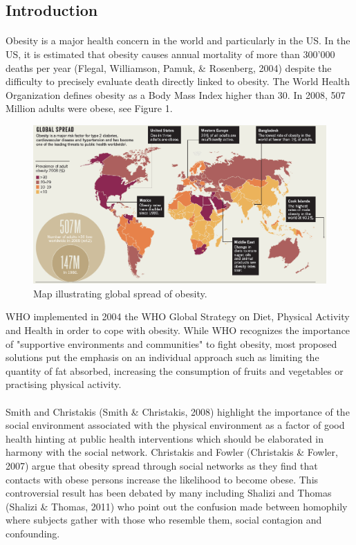 \documentclass[11pt]{article}
\begin{document}
\subsection{Introduction}
\paragraph{}
Obesity is a major health concern in the world and particularly in the US. In the US, it is estimated that obesity causes annual mortality of more than 300'000 deaths per year (Flegal, Williamson, Pamuk, \& Rosenberg, 2004) despite the difficulty to precisely evaluate death directly linked to obesity. The World Health Organization defines obesity as a Body Mass Index higher than 30. In 2008, 507 Million adults were obese, see Figure 1.
\begin{figure}[!ht]
\center
   \includegraphics[scale = 0.25]{Nature_p50_Global_spread_of_obesity.png}
   \caption{\label{4} Map illustrating global spread of obesity.}
\end{figure}
 WHO implemented in 2004 the WHO Global Strategy on Diet, Physical Activity and Health in order to cope with obesity. While WHO recognizes the importance of "supportive environments and communities" to fight obesity, most proposed solutions put the emphasis on an individual approach such as limiting the quantity of fat absorbed, increasing the consumption of fruits and vegetables or practising physical activity. 

\paragraph{}
Smith and Christakis (Smith \& Christakis, 2008)  highlight the importance of the social environment associated with the physical environment as a factor of good health hinting at public health interventions which should be elaborated in harmony with the social network. Christakis and Fowler (Christakis \& Fowler, 2007) argue that obesity spread  through social networks as they find that contacts with obese persons increase the likelihood to become obese. This controversial result has been debated by many including Shalizi and Thomas (Shalizi \& Thomas, 2011) who point out the confusion made between homophily where subjects gather with those who resemble them, social contagion and confounding.
\end{document}
